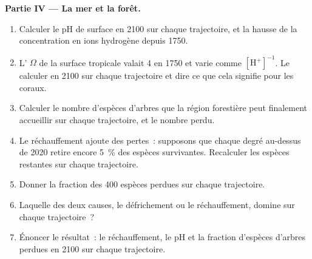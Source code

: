 \begin{problem}
\medskip
\noindent\textbf{Partie IV --- La mer et la forêt.}
\begin{enumerate}[resume]
  \item Calculer le pH de surface en 2100 sur chaque trajectoire, et la
        hausse de la concentration en ions hydrogène depuis 1750.
  \item L' $\Omega$ de la surface tropicale valait
        4 en 1750 et varie comme $[\ensuremath{\mathrm{H^{+}}}]^{-1}$. Le calculer en 2100
        sur chaque trajectoire et dire ce que cela signifie pour les coraux.
  \item Calculer le nombre d'espèces d'arbres que la région forestière
        peut finalement accueillir sur chaque trajectoire, et le nombre
        perdu.
  \item Le réchauffement ajoute des pertes~: supposons que chaque degré
        au-dessus de 2020 retire encore \qty{5}{\%} des espèces
        survivantes. Recalculer les espèces restantes sur chaque
        trajectoire.
  \item Donner la fraction des 400 espèces perdues sur chaque trajectoire.
  \item Laquelle des deux causes, le défrichement ou le réchauffement,
        domine sur chaque trajectoire~?
  \item Énoncer le résultat~: le réchauffement, le pH et la fraction
        d'espèces d'arbres perdues en 2100 sur chaque trajectoire.
\end{enumerate}
\end{problem}
